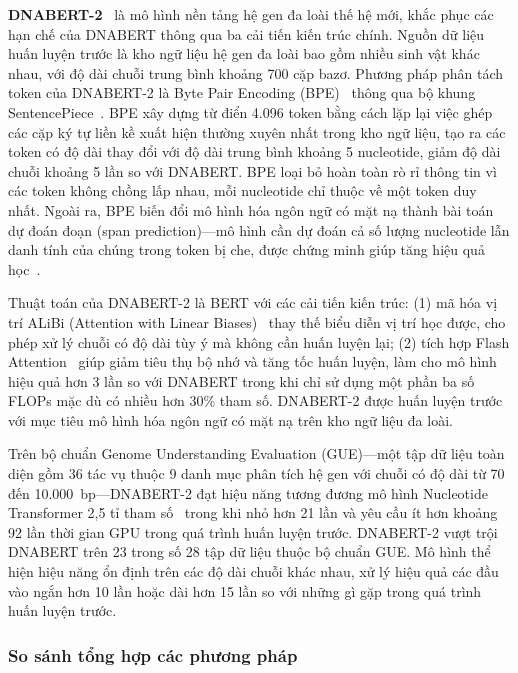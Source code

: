 \textbf{DNABERT-2}~\cite{zhou2023dnabert} là mô hình nền tảng hệ gen đa loài thế hệ mới, khắc phục các hạn chế của DNABERT thông qua ba cải tiến kiến trúc chính. Nguồn dữ liệu huấn luyện trước là kho ngữ liệu hệ gen đa loài bao gồm nhiều sinh vật khác nhau, với độ dài chuỗi trung bình khoảng 700 cặp bazơ. Phương pháp phân tách token của DNABERT-2 là Byte Pair Encoding (BPE)~\cite{sennrich2015neural} thông qua bộ khung SentencePiece~\cite{kudo2018sentencepiece}. BPE xây dựng từ điển 4.096 token bằng cách lặp lại việc ghép các cặp ký tự liền kề xuất hiện thường xuyên nhất trong kho ngữ liệu, tạo ra các token có độ dài thay đổi với độ dài trung bình khoảng 5 nucleotide, giảm độ dài chuỗi khoảng 5 lần so với DNABERT. BPE loại bỏ hoàn toàn rò rỉ thông tin vì các token không chồng lấp nhau, mỗi nucleotide chỉ thuộc về một token duy nhất. Ngoài ra, BPE biến đổi mô hình hóa ngôn ngữ có mặt nạ thành bài toán dự đoán đoạn (span prediction)---mô hình cần dự đoán cả số lượng nucleotide lẫn danh tính của chúng trong token bị che, được chứng minh giúp tăng hiệu quả học~\cite{zhou2023dnabert,raffel2020exploring}.

Thuật toán của DNABERT-2 là BERT với các cải tiến kiến trúc: (1) mã hóa vị trí ALiBi (Attention with Linear Biases)~\cite{press2021train} thay thế biểu diễn vị trí học được, cho phép xử lý chuỗi có độ dài tùy ý mà không cần huấn luyện lại; (2) tích hợp Flash Attention~\cite{dao2022flashattention} giúp giảm tiêu thụ bộ nhớ và tăng tốc huấn luyện, làm cho mô hình hiệu quả hơn 3 lần so với DNABERT trong khi chỉ sử dụng một phần ba số FLOPs mặc dù có nhiều hơn 30\% tham số. DNABERT-2 được huấn luyện trước với mục tiêu mô hình hóa ngôn ngữ có mặt nạ trên kho ngữ liệu đa loài.

Trên bộ chuẩn Genome Understanding Evaluation (GUE)---một tập dữ liệu toàn diện gồm 36 tác vụ thuộc 9 danh mục phân tích hệ gen với chuỗi có độ dài từ 70 đến 10.000~bp---DNABERT-2 đạt hiệu năng tương đương mô hình Nucleotide Transformer 2,5 tỉ tham số~\cite{dalla2025nucleotide} trong khi nhỏ hơn 21 lần và yêu cầu ít hơn khoảng 92 lần thời gian GPU trong quá trình huấn luyện trước. DNABERT-2 vượt trội DNABERT trên 23 trong số 28 tập dữ liệu thuộc bộ chuẩn GUE. Mô hình thể hiện hiệu năng ổn định trên các độ dài chuỗi khác nhau, xử lý hiệu quả các đầu vào ngắn hơn 10 lần hoặc dài hơn 15 lần so với những gì gặp trong quá trình huấn luyện trước.

\subsubsection{So sánh tổng hợp các phương pháp}

